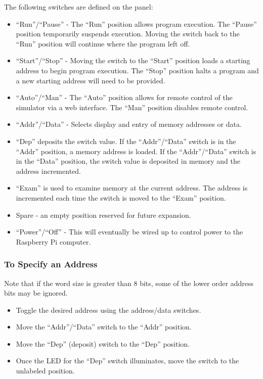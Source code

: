 \documentclass[10pt, openany]{book}
\newcommand{\switch}[2]{``#1''/``#2''}
\newcommand{\position}[1]{``#1''}
\begin{document}
The following switches are defined on the panel:
\begin{itemize}
  \item \switch{Run}{Pause} - The \position{Run} position allows program execution.  The \position{Pause} position temporarily suspends execution.  Moving the switch back to the \position{Run} position will continue where the program left off.
  \item \switch{Start}{Stop} - Moving the switch to the \position{Start} position loads a starting address to begin program execution.  The \position{Stop} position halts a program and a new starting address will need to be provided.
  \item \switch{Auto}{Man} - The \position{Auto} position allows for remote control of the simulator via a web interface.  The \position{Man} position disables remote control.
  \item \switch{Addr}{Data} - Selects display and entry of memory addresses or data.
  \item \position{Dep} deposits the switch value.  If the \switch{Addr}{Data} switch is in the \position{Addr} position, a memory address is loaded.  If the \switch{Addr}{Data} switch is in the \position{Data} position, the switch value is deposited in memory and the address incremented.
  \item \position{Exam} is used to examine memory at the current address.  The address is incremented each time the switch is moved to the \position{Exam} position.
  \item Spare - an empty position reserved for future expansion.
  \item \switch{Power}{Off} - This will eventually be wired up to control power to the Raspberry Pi computer.
\end{itemize}

\subsubsection{To Specify an Address}
Note that if the word size is greater than 8 bits, some of the lower order address bits may be ignored.
\begin{itemize}
  \item Toggle the desired address using the address/data switches.
  \item Move the \switch{Addr}{Data} switch to the \position{Addr} position.
  \item Move the ``Dep'' (deposit) switch to the \position{Dep} position.
  \item Once the LED for the ``Dep'' switch illuminates, move the switch to the unlabeled position.
\end{itemize}
\end{document}
